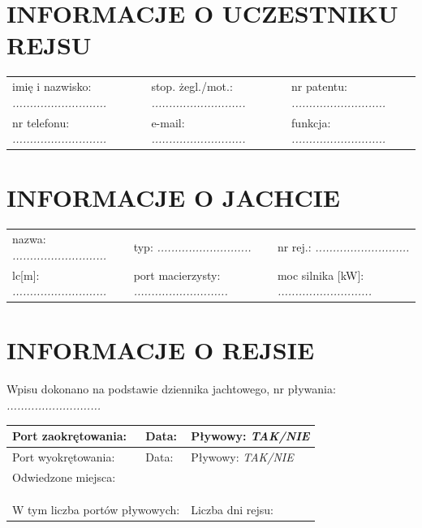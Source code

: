 \documentclass{article}
\begin{document}
\section*{INFORMACJE O UCZESTNIKU REJSU}
\begin{tabularx}{\textwidth}{X X X}
imię i nazwisko: \textit{...........................} & stop. żegl./mot.: \textit{...........................} & nr patentu: \textit{...........................} \\
nr telefonu: \textit{...........................} & e-mail: \textit{...........................} & funkcja: \textit{...........................} \\
\end{tabularx}

\section*{INFORMACJE O JACHCIE}

\begin{tabularx}{\textwidth}{X X X}
nazwa: \textit{...........................} & typ: \textit{...........................} & nr rej.: \textit{...........................} \\
lc[m]: \textit{...........................} & port macierzysty: \textit{...........................} & moc silnika [kW]: \textit{...........................} \\
\end{tabularx}

\section*{INFORMACJE O REJSIE}

Wpisu dokonano na podstawie dziennika jachtowego, nr pływania: \textit{...........................}
\\

\begin{tabularx}{\textwidth}{|X|X|X|}
\hline
Port zaokrętowania: \textit{} & Data: \textit{} & Pływowy: \textit{TAK/NIE} \\
\hline
Port wyokrętowania: \textit{} & Data: \textit{} & Pływowy: \textit{TAK/NIE} \\
\hline
\multicolumn{3}{|l|}{Odwiedzone miejsca:
\dotfill} \\
\multicolumn{3}{|l|}{\dotfill} \\
\multicolumn{3}{|l|}{\dotfill} \\
\multicolumn{3}{|l|}{\dotfill} \\

\hline
\multicolumn{2}{|l|}{W tym liczba portów pływowych: \textit{}} & Liczba dni rejsu: \textit{}\\
\hline
\end{tabularx}
\\\\
\end{document}

